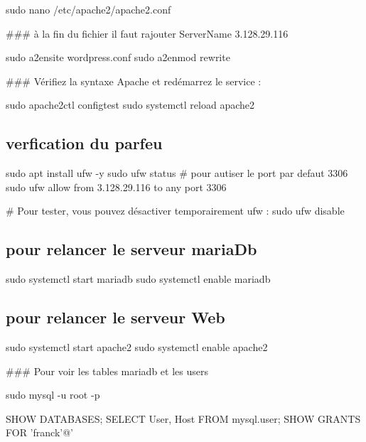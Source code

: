 \begin{DoxyCode}
sudo nano /etc/apache2/apache2.conf

### à la fin du fichier il faut rajouter
ServerName 3.128.29.116
\end{DoxyCode}



\begin{DoxyCode}
sudo a2ensite wordpress.conf
sudo a2enmod rewrite
\end{DoxyCode}


\#\#\# Vérifiez la syntaxe Apache et redémarrez le service \+: 
\begin{DoxyCode}
sudo apache2ctl configtest
sudo systemctl reload apache2
\end{DoxyCode}


\subsection*{verfication du parfeu}


\begin{DoxyCode}
sudo apt install ufw -y
sudo ufw status
# pour autiser le port par defaut 3306
sudo ufw allow from 3.128.29.116 to any port 3306

# Pour tester, vous pouvez désactiver temporairement ufw :
sudo ufw disable
\end{DoxyCode}


\subsection*{pour relancer le serveur maria\+Db}


\begin{DoxyCode}
sudo systemctl start mariadb
sudo systemctl enable mariadb
\end{DoxyCode}


\subsection*{pour relancer le serveur Web}


\begin{DoxyCode}
sudo systemctl start apache2
sudo systemctl enable apache2
\end{DoxyCode}


\#\#\# Pour voir les tables mariadb et les users 
\begin{DoxyCode}
sudo mysql -u root -p

SHOW DATABASES;
SELECT User, Host FROM mysql.user;
SHOW GRANTS FOR 'franck'@'%
\end{DoxyCode}


